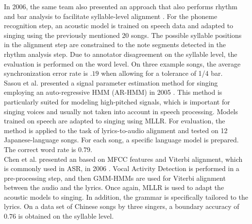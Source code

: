 In 2006, the same team also presented an approach that also performs rhythm and bar analysis to facilitate syllable-level alignment \cite{Iskandar:2006}. For the phoneme recognition step, an acoustic model is trained on speech data and adapted to singing using the previously mentioned 20 songs. The possible syllable positions in the alignment step are constrained to the note segments detected in the rhythm analysis step. Due to annotator disagreement on the syllable level, the evaluation is performed on the word level. On three example songs, the average synchronization error rate is $.19$ when allowing for a tolerance of 1/4 bar.\\  

Sasou et al. presented a signal parameter estimation method for singing employing an auto-regressive HMM (AR-HMM) in 2005 \cite{Sasou2005AnAN}. This method is particularly suited for modeling high-pitched signals, which is important for singing voices and usually not taken into account in speech processing. Models trained on speech are adapted to singing using MLLR. For evaluation, the method is applied to the task of lyrics-to-audio alignment and tested on 12 Japanese-language songs. For each song, a specific language model is prepared. The correct word rate is $0.79$.\\

Chen et al. presented an based on MFCC features and Viterbi alignment, which is commonly used in ASR, in 2006 \cite{popular_synchronization}. Vocal Activity Detection is performed in a pre-processing step, and then GMM-HMMs are used for Viterbi alignment between the audio and the lyrics. Once again, MLLR is used to adapt the acoustic models to singing. In addition, the grammar is specifically tailored to the lyrics. On a data set of Chinese songs by three singers, a boundary accuracy of $0.76$ is obtained on the syllable level.\\

